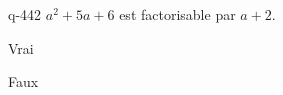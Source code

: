 \begin{truefalse}{q-442}
$a^2+5a+6$ est factorisable par $a+2$.
\item* Vrai
\item Faux
\end{truefalse}

